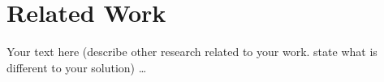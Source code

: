 \chapter{Related Work}\label{chap:related}
\chapterstart

Your text here (describe other research related to your work. state what is different to your solution) \ldots

\chapterend